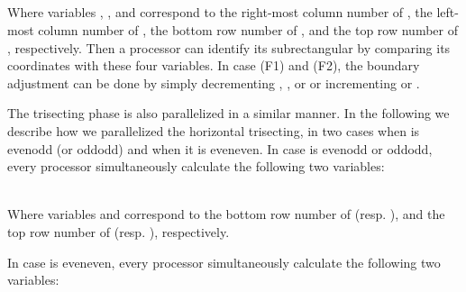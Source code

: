 \documentclass[preprint,12pt]{elsarticle}
\begin{document}
 
  \\


  \\


  \\


  \\
  \par
Where variables , ,  and  correspond to the
right-most column number of ,  the left-most column number of
, the bottom row number of , and the top row number of
, respectively. Then a processor can identify its
subrectangular by comparing its coordinates with these four
variables. In case (F1) and (F2), the boundary
adjustment can be done by simply decrementing , ,
 or  or incrementing  or .


\par The trisecting phase is also parallelized in a similar manner. In the following we describe
how we parallelized the horizontal trisecting, in two cases when
 is evenodd (or oddodd) and when it is
eveneven. In case 
is evenodd or oddodd, every processor simultaneously calculate the following two variables:\\
\\
\par
Where variables  and  correspond to the bottom row number of
 (resp. ), and the top row number of
 (resp. ), respectively.\par In case 
is eveneven, every processor simultaneously calculate the
following two variables:
\\
\\
\\
\end{document}
